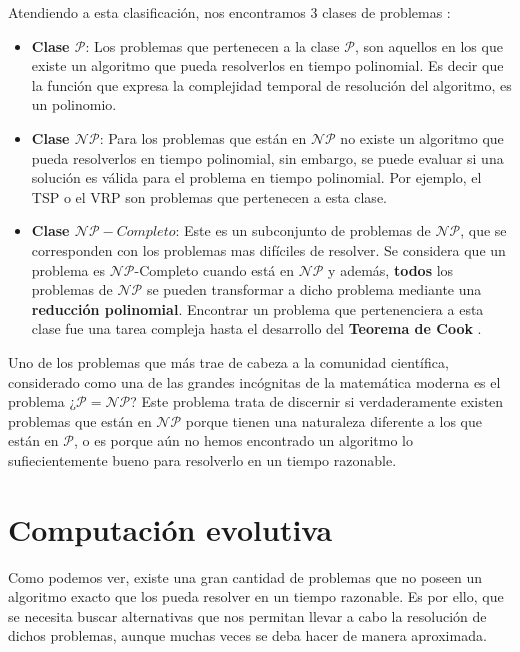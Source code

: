 Atendiendo a esta clasificación, nos encontramos 3 clases de problemas \cite{papadimitriou2003computational}:

\begin{itemize}
    \item \textbf{Clase $\mathcal{P}$}: Los problemas que pertenecen a la clase $\mathcal{P}$, son aquellos en los que existe un algoritmo que pueda resolverlos en tiempo polinomial. Es decir que la función que expresa la complejidad temporal de resolución del algoritmo, es un polinomio.
    \item \textbf{Clase $\mathcal{NP}$}: Para los problemas que están en $\mathcal{NP}$ no existe un algoritmo que pueda resolverlos en tiempo polinomial, sin embargo, se puede evaluar si una solución es válida para el problema en tiempo polinomial. Por ejemplo, el TSP o el VRP son problemas que pertenecen a esta clase.
    \item \textbf{Clase $\mathcal{NP}-Completo$}: Este es un subconjunto de problemas de $\mathcal{NP}$, que se corresponden con los problemas mas difíciles de resolver. Se considera que un problema es $\mathcal{NP}$-Completo cuando está en $\mathcal{NP}$ y además, \textbf{todos} los problemas de $\mathcal{NP}$ se pueden transformar a dicho problema mediante una \textbf{reducción polinomial}. Encontrar un problema que pertenenciera a esta clase fue una tarea compleja hasta el desarrollo del \textbf{Teorema de Cook} \cite{garey2002computers}.
\end{itemize}

Uno de los problemas que más trae de cabeza a la comunidad científica, considerado como una de las grandes incógnitas de la matemática moderna es el problema ¿$\mathcal{P} = \mathcal{NP}$? Este problema trata de discernir si verdaderamente existen problemas que están en $\mathcal{NP}$ \cite{baker1975relativizations} porque tienen una naturaleza diferente a los que están en $\mathcal{P}$, o es porque aún no hemos encontrado un algoritmo lo sufiecientemente bueno para resolverlo en un tiempo razonable.

\section{Computación evolutiva}
\label{1:sec:2}

Como podemos ver, existe una gran cantidad de problemas que no poseen un algoritmo exacto que los pueda resolver en un tiempo razonable. Es por ello, que se necesita buscar alternativas que nos permitan llevar a cabo la resolución de dichos problemas, aunque muchas veces se deba hacer de manera aproximada. \\

